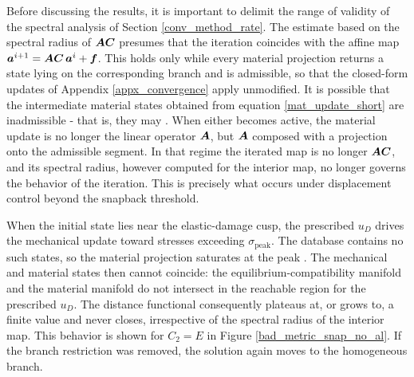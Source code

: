 \documentclass[10pt]{cas-sc}
\begin{document}
Before discussing the results, it is important to delimit the range of validity of the spectral analysis of Section \ref{conv_method_rate}. The  estimate based on the spectral radius of $\mbox{\boldmath $A$}\mbox{\boldmath $C$}$ presumes that the iteration coincides with the affine map $\mbox{\boldmath $a$}^{i+1} = \mbox{\boldmath $A$}\mbox{\boldmath $C$}\,\mbox{\boldmath $a$}^{i} + \mbox{\boldmath $f$}$. This holds only while every material projection returns a state lying on the corresponding branch and is admissible, so that the closed-form updates of Appendix \ref{appx_convergence} apply unmodified. It is possible that the intermediate material states obtained from equation \eqref{mat_update_short} are inadmissible - that is, they may  . When either  becomes active, the material update is no longer the linear operator $\mbox{\boldmath $A$}$, but $\mbox{\boldmath $A$}$ composed with a projection onto the admissible segment. In that regime the iterated map is no longer $\mbox{\boldmath $A$}\mbox{\boldmath $C$}$, and its spectral radius, however computed for the interior map, no longer governs the behavior of the iteration. This is precisely what occurs under displacement control beyond the snapback threshold. 

When the initial state lies near the elastic-damage cusp, the prescribed $u_D$ drives the mechanical update toward stresses exceeding $\sigma_{\mathrm{peak}}$. The database contains no such states, so the material projection saturates at the peak . The mechanical and material states then cannot coincide: the equilibrium-compatibility manifold and the material manifold do not intersect in the reachable region for the prescribed $u_D$. The distance functional consequently plateaus at, or grows to, a finite value and never closes, irrespective of the spectral radius of the interior map. This behavior is shown for $C_2 = E$ in Figure \ref{bad_metric_snap_no_al}. If the branch restriction was removed, the solution again moves to the homogeneous branch. 
\end{document}
